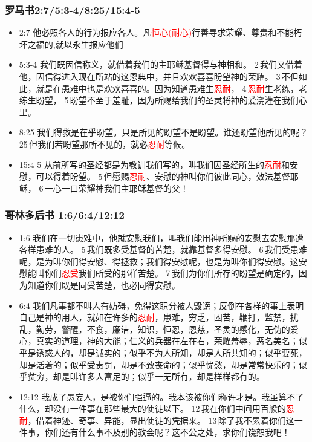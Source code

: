 \subsubsection{罗马书2:7/5:3-4/8:25/15:4-5} 
\begin{itemize}[noitemsep]
\item 2:7 他必照各人的行为报应各人。凡\textcolor{red}{恒心(耐心)}行善寻求荣耀、尊贵和不能朽坏之福的,就以永生报应他们
\item 5:3-4 我们既因信称义，就借着我们的主耶稣基督得与神相和。 2 我们又借着他，因信得进入现在所站的这恩典中，并且欢欢喜喜盼望神的荣耀。 3 不但如此，就是在患难中也是欢欢喜喜的。因为知道患难生\textcolor{red}{忍耐}， 4 \textcolor{red}{忍耐}生老练，老练生盼望， 5 盼望不至于羞耻，因为所赐给我们的圣灵将神的爱浇灌在我们心里。
\item 8:25 我们得救是在乎盼望。只是所见的盼望不是盼望。谁还盼望他所见的呢？25 但我们若盼望那所不见的，就必\textcolor{red}{忍耐}等候。
\item 15:4-5 从前所写的圣经都是为教训我们写的，叫我们因圣经所生的\textcolor{red}{忍耐}和安慰，可以得着盼望。 5 但愿赐\textcolor{red}{忍耐}、安慰的神叫你们彼此同心，效法基督耶稣， 6 一心一口荣耀神我们主耶稣基督的父！
\end{itemize}

\subsubsection{哥林多后书 1:6/6:4/12:12} 
\begin{itemize}[noitemsep]
\item 1:6 我们在一切患难中，他就安慰我们，叫我们能用神所赐的安慰去安慰那遭各样患难的人。 5 我们既多受基督的苦楚，就靠基督多得安慰。 6 我们受患难呢，是为叫你们得安慰、得拯救；我们得安慰呢，也是为叫你们得安慰。这安慰能叫你们\textcolor{red}{忍受}我们所受的那样苦楚。 7 我们为你们所存的盼望是确定的，因为知道你们既是同受苦楚，也必同得安慰。
\item 6:4 我们凡事都不叫人有妨碍，免得这职分被人毁谤；反倒在各样的事上表明自己是神的用人，就如在许多的\textcolor{red}{忍耐}，患难，穷乏，困苦，鞭打，监禁，扰乱，勤劳，警醒，不食，廉洁，知识，恒忍，恩慈，圣灵的感化，无伪的爱心，真实的道理，神的大能；仁义的兵器在左在右，荣耀羞辱，恶名美名；似乎是诱惑人的，却是诚实的；似乎不为人所知，却是人所共知的；似乎要死，却是活着的；似乎受责罚，却是不致丧命的；似乎忧愁，却是常常快乐的；似乎贫穷，却是叫许多人富足的；似乎一无所有，却是样样都有的。
\item 12:12 我成了愚妄人，是被你们强逼的。我本该被你们称许才是。我虽算不了什么，却没有一件事在那些最大的使徒以下。 12 我在你们中间用百般的\textcolor{red}{忍耐}，借着神迹、奇事、异能，显出使徒的凭据来。 13 除了我不累着你们这一件事，你们还有什么事不及别的教会呢？这不公之处，求你们饶恕我吧！
\end{itemize}

